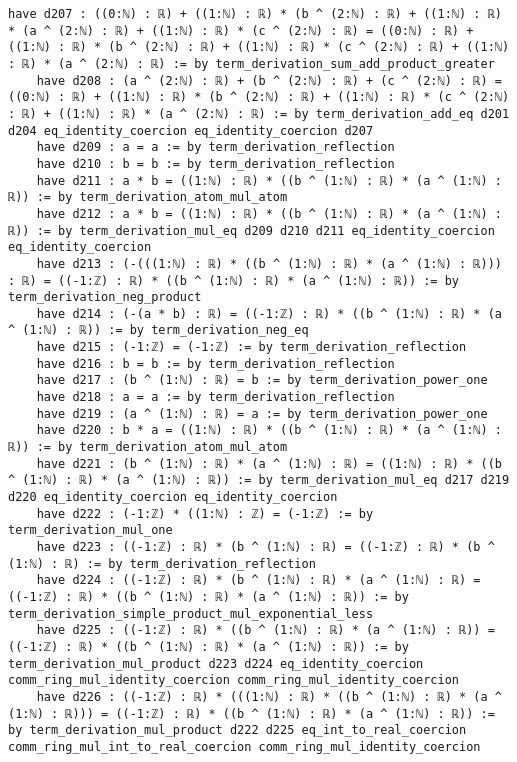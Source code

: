 \documentclass{article}
\begin{document}
\begin{tcolorbox}[colback=white!10, width=\linewidth]
\begin{lstlisting}[language=Lean4]
    have d207 : ((0:ℕ) : ℝ) + ((1:ℕ) : ℝ) * (b ^ (2:ℕ) : ℝ) + ((1:ℕ) : ℝ) * (a ^ (2:ℕ) : ℝ) + ((1:ℕ) : ℝ) * (c ^ (2:ℕ) : ℝ) = ((0:ℕ) : ℝ) + ((1:ℕ) : ℝ) * (b ^ (2:ℕ) : ℝ) + ((1:ℕ) : ℝ) * (c ^ (2:ℕ) : ℝ) + ((1:ℕ) : ℝ) * (a ^ (2:ℕ) : ℝ) := by term_derivation_sum_add_product_greater
    have d208 : (a ^ (2:ℕ) : ℝ) + (b ^ (2:ℕ) : ℝ) + (c ^ (2:ℕ) : ℝ) = ((0:ℕ) : ℝ) + ((1:ℕ) : ℝ) * (b ^ (2:ℕ) : ℝ) + ((1:ℕ) : ℝ) * (c ^ (2:ℕ) : ℝ) + ((1:ℕ) : ℝ) * (a ^ (2:ℕ) : ℝ) := by term_derivation_add_eq d201 d204 eq_identity_coercion eq_identity_coercion d207
    have d209 : a = a := by term_derivation_reflection
    have d210 : b = b := by term_derivation_reflection
    have d211 : a * b = ((1:ℕ) : ℝ) * ((b ^ (1:ℕ) : ℝ) * (a ^ (1:ℕ) : ℝ)) := by term_derivation_atom_mul_atom
    have d212 : a * b = ((1:ℕ) : ℝ) * ((b ^ (1:ℕ) : ℝ) * (a ^ (1:ℕ) : ℝ)) := by term_derivation_mul_eq d209 d210 d211 eq_identity_coercion eq_identity_coercion
    have d213 : (-(((1:ℕ) : ℝ) * ((b ^ (1:ℕ) : ℝ) * (a ^ (1:ℕ) : ℝ))) : ℝ) = ((-1:ℤ) : ℝ) * ((b ^ (1:ℕ) : ℝ) * (a ^ (1:ℕ) : ℝ)) := by term_derivation_neg_product
    have d214 : (-(a * b) : ℝ) = ((-1:ℤ) : ℝ) * ((b ^ (1:ℕ) : ℝ) * (a ^ (1:ℕ) : ℝ)) := by term_derivation_neg_eq
    have d215 : (-1:ℤ) = (-1:ℤ) := by term_derivation_reflection
    have d216 : b = b := by term_derivation_reflection
    have d217 : (b ^ (1:ℕ) : ℝ) = b := by term_derivation_power_one
    have d218 : a = a := by term_derivation_reflection
    have d219 : (a ^ (1:ℕ) : ℝ) = a := by term_derivation_power_one
    have d220 : b * a = ((1:ℕ) : ℝ) * ((b ^ (1:ℕ) : ℝ) * (a ^ (1:ℕ) : ℝ)) := by term_derivation_atom_mul_atom
    have d221 : (b ^ (1:ℕ) : ℝ) * (a ^ (1:ℕ) : ℝ) = ((1:ℕ) : ℝ) * ((b ^ (1:ℕ) : ℝ) * (a ^ (1:ℕ) : ℝ)) := by term_derivation_mul_eq d217 d219 d220 eq_identity_coercion eq_identity_coercion
    have d222 : (-1:ℤ) * ((1:ℕ) : ℤ) = (-1:ℤ) := by term_derivation_mul_one
    have d223 : ((-1:ℤ) : ℝ) * (b ^ (1:ℕ) : ℝ) = ((-1:ℤ) : ℝ) * (b ^ (1:ℕ) : ℝ) := by term_derivation_reflection
    have d224 : ((-1:ℤ) : ℝ) * (b ^ (1:ℕ) : ℝ) * (a ^ (1:ℕ) : ℝ) = ((-1:ℤ) : ℝ) * ((b ^ (1:ℕ) : ℝ) * (a ^ (1:ℕ) : ℝ)) := by term_derivation_simple_product_mul_exponential_less
    have d225 : ((-1:ℤ) : ℝ) * ((b ^ (1:ℕ) : ℝ) * (a ^ (1:ℕ) : ℝ)) = ((-1:ℤ) : ℝ) * ((b ^ (1:ℕ) : ℝ) * (a ^ (1:ℕ) : ℝ)) := by term_derivation_mul_product d223 d224 eq_identity_coercion comm_ring_mul_identity_coercion comm_ring_mul_identity_coercion
    have d226 : ((-1:ℤ) : ℝ) * (((1:ℕ) : ℝ) * ((b ^ (1:ℕ) : ℝ) * (a ^ (1:ℕ) : ℝ))) = ((-1:ℤ) : ℝ) * ((b ^ (1:ℕ) : ℝ) * (a ^ (1:ℕ) : ℝ)) := by term_derivation_mul_product d222 d225 eq_int_to_real_coercion comm_ring_mul_int_to_real_coercion comm_ring_mul_identity_coercion

\end{lstlisting}
\end{tcolorbox}
\end{document}
